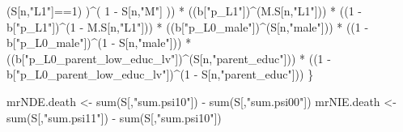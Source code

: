 \documentclass[
]{book}
\newenvironment{Shaded}{\begin{snugshade}}{\end{snugshade}}
\newcommand{\DecValTok}[1]{\textcolor[rgb]{0.00,0.00,0.81}{#1}}
\newcommand{\FunctionTok}[1]{\textcolor[rgb]{0.00,0.00,0.00}{#1}}
\newcommand{\NormalTok}[1]{#1}
\newcommand{\OtherTok}[1]{\textcolor[rgb]{0.56,0.35,0.01}{#1}}
\newcommand{\SpecialCharTok}[1]{\textcolor[rgb]{0.00,0.00,0.00}{#1}}
\newcommand{\StringTok}[1]{\textcolor[rgb]{0.31,0.60,0.02}{#1}}
\begin{document}
\begin{Shaded}
\begin{Highlighting}[]
\NormalTok{          (S[n,}\StringTok{"L1"}\NormalTok{]}\SpecialCharTok{==}\DecValTok{1}\NormalTok{) )}\SpecialCharTok{\^{}}\NormalTok{( }\DecValTok{1} \SpecialCharTok{{-}}\NormalTok{ S[n,}\StringTok{"M"}\NormalTok{] )) }\SpecialCharTok{*}
\NormalTok{      ((b[}\StringTok{"p\_L1"}\NormalTok{])}\SpecialCharTok{\^{}}\NormalTok{(M.S[n,}\StringTok{"L1"}\NormalTok{])) }\SpecialCharTok{*}
\NormalTok{      ((}\DecValTok{1} \SpecialCharTok{{-}}\NormalTok{ b[}\StringTok{"p\_L1"}\NormalTok{])}\SpecialCharTok{\^{}}\NormalTok{(}\DecValTok{1} \SpecialCharTok{{-}}\NormalTok{ M.S[n,}\StringTok{"L1"}\NormalTok{])) }\SpecialCharTok{*}
\NormalTok{      ((b[}\StringTok{"p\_L0\_male"}\NormalTok{])}\SpecialCharTok{\^{}}\NormalTok{(S[n,}\StringTok{"male"}\NormalTok{])) }\SpecialCharTok{*} 
\NormalTok{      ((}\DecValTok{1} \SpecialCharTok{{-}}\NormalTok{ b[}\StringTok{"p\_L0\_male"}\NormalTok{])}\SpecialCharTok{\^{}}\NormalTok{(}\DecValTok{1} \SpecialCharTok{{-}}\NormalTok{ S[n,}\StringTok{"male"}\NormalTok{])) }\SpecialCharTok{*} 
\NormalTok{      ((b[}\StringTok{"p\_L0\_parent\_low\_educ\_lv"}\NormalTok{])}\SpecialCharTok{\^{}}\NormalTok{(S[n,}\StringTok{"parent\_educ"}\NormalTok{])) }\SpecialCharTok{*}
\NormalTok{      ((}\DecValTok{1} \SpecialCharTok{{-}}\NormalTok{ b[}\StringTok{"p\_L0\_parent\_low\_educ\_lv"}\NormalTok{])}\SpecialCharTok{\^{}}\NormalTok{(}\DecValTok{1} \SpecialCharTok{{-}}\NormalTok{ S[n,}\StringTok{"parent\_educ"}\NormalTok{])) }
\NormalTok{    \}}
  
\NormalTok{  mrNDE.death }\OtherTok{\textless{}{-}} \FunctionTok{sum}\NormalTok{(S[,}\StringTok{"sum.psi10"}\NormalTok{]) }\SpecialCharTok{{-}} \FunctionTok{sum}\NormalTok{(S[,}\StringTok{"sum.psi00"}\NormalTok{])}
\NormalTok{  mrNIE.death }\OtherTok{\textless{}{-}} \FunctionTok{sum}\NormalTok{(S[,}\StringTok{"sum.psi11"}\NormalTok{]) }\SpecialCharTok{{-}} \FunctionTok{sum}\NormalTok{(S[,}\StringTok{"sum.psi10"}\NormalTok{])}
  

\end{Highlighting}
\end{Shaded}
\end{document}
